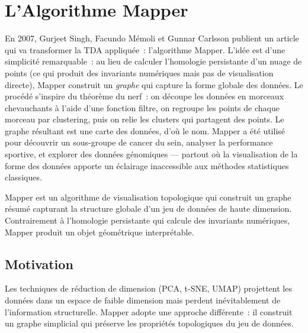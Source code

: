 \chapter{L'Algorithme Mapper}
\label{ch:mapper}

En 2007, Gurjeet Singh, Facundo M\'emoli et Gunnar Carlsson publient un article qui va transformer la TDA appliqu\'ee~: l'algorithme Mapper. L'id\'ee est d'une simplicit\'e remarquable~: au lieu de calculer l'homologie persistante d'un nuage de points (ce qui produit des invariants num\'eriques mais pas de visualisation directe), Mapper construit un \emph{graphe} qui capture la forme globale des donn\'ees. Le proc\'ed\'e s'inspire du th\'eor\`eme du nerf~: on d\'ecoupe les donn\'ees en morceaux chevauchants \`a l'aide d'une fonction filtre, on regroupe les points de chaque morceau par clustering, puis on relie les clusters qui partagent des points. Le graphe r\'esultant est une \og carte \fg{} des donn\'ees, d'o\`u le nom. Mapper a \'et\'e utilis\'e pour d\'ecouvrir un sous-groupe de cancer du sein, analyser la performance sportive, et explorer des donn\'ees g\'enomiques --- partout o\`u la visualisation de la \og forme \fg{} des donn\'ees apporte un \'eclairage inaccessible aux m\'ethodes statistiques classiques.

\begin{intuition}
Mapper est un algorithme de visualisation topologique qui construit un
graphe r\'esum\'e capturant la structure globale d'un jeu de donn\'ees
de haute dimension. Contrairement \`a l'homologie persistante qui
calcule des invariants num\'eriques, Mapper produit un objet
g\'eom\'etrique interpr\'etable.
\end{intuition}

\section{Motivation}

Les techniques de r\'eduction de dimension (PCA, t-SNE, UMAP) projettent
les donn\'ees dans un espace de faible dimension mais perdent
in\'evitablement de l'information structurelle. Mapper adopte une
approche diff\'erente~: il construit un graphe simplicial qui pr\'eserve
les propri\'et\'es topologiques du jeu de donn\'ees.

